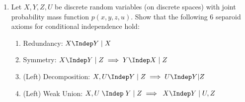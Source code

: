 \begin{enumerate}
  Check if $X$ is conditionally independent of $Y$ given $Z$. Provide the steps through your derivations.
  \begin{ungradedsolution}
    Given a rank one matrix $M$ with factorization $M=vw^T$, all other factorizations are related to this factorization by $M=(v \lambda)(w / \lambda)^T$ for $\lambda \in \mathbb{R}\setminus\{0\}$. Choose $\lambda$ such that $\sum v_i=1$. Then if $M$ is normalized, $1=\sum_{ij}M_{ij}=\sum_{ij}v_iw_j=\sum_jw_j$, $w$ is also normalized. Consequently, $v_i=v_i \sum_j w_j = \sum_j M_{ij}$ and $w_j= w_j \sum_i v_i = \sum_i M_{ij} $. If $M$ is non-negative, then $v$ and $w$ are also non-negative. Hence, $v$ and $w$ are the marginals of $M$.

    Hence, for any joint distribution $P(X, Y|Z=z)$, we only need to check if the matrix $p(x, y|z)$ is rank-one, as it can then be written as $p(x,y|z)=p(x|z)p(y|z)$. This is here the case.

    Alternatively, it's easy to read off $p(x|z)$ and $p(y|z)$ from the joint distribution and verify $p(x,y|z)=p(x|z)p(y|z)$, or read off $p(x|z)$ and $p(x|y,z)$ and verify $p(x|z) = p(x|y,z)$.
  \end{ungradedsolution}

  \item %
  Let $X,Y,Z,U$ be discrete random variables (on discrete spaces) with joint probability mass function $p(x,y,z,u)$. Show that the following 6 separoid axioms for conditional independence hold:

  \begin{enumerate}
    \item Redundancy: $X \Indep Y \;|\; X$

    \item Symmetry: $X \Indep Y\; |\; Z \implies Y \Indep X\; |\; Z$

    \item (Left) Decomposition: $X, U \Indep Y \; | \; Z \implies U \Indep Y | Z\; $

    \item (Left) Weak Union: $X,U \;\Indep \;  Y \; | \; Z \implies  \; X \Indep Y \; |\; U,Z $


\end{enumerate}
\end{enumerate}
